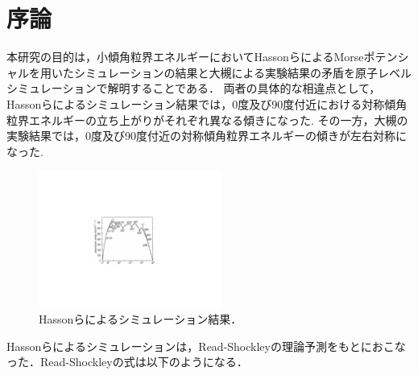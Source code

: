 
\section{序論}
本研究の目的は，小傾角粒界エネルギーにおいてHassonらによるMorseポテンシャルを用いたシミュレーションの結果と大槻による実験結果の矛盾を原子レベルシミュレーションで解明することである．
両者の具体的な相違点として，Hassonらによるシミュレーション結果では，0度及び90度付近における対称傾角粒界エネルギーの立ち上がりがそれぞれ異なる傾きになった.
その一方，大槻の実験結果では，0度及び90度付近の対称傾角粒界エネルギーの傾きが左右対称になった.

\begin{figure}[htbp]\begin{center}
\includegraphics[width=6cm,bb=0 0 442 500]{../figs/./boundary_narita.002.jpg}
\caption{Hassonらによるシミュレーション結果．}
\label{default}\end{center}\end{figure}
Hassonらによるシミュレーションは，Read-Shockleyの理論予測をもとにおこなった．Read-Shockleyの式は以下のようになる．

